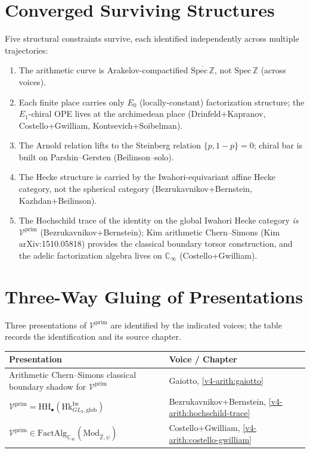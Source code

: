 \section{Converged Surviving Structures}
\label{v4-arith:app:B:converged-structures}

Five structural constraints survive, each identified independently
across multiple trajectories:

\begin{enumerate}
\item The arithmetic curve is Arakelov-compactified
\(\overline{\mathrm{Spec}\,\mathbb{Z}}\), not \(\mathrm{Spec}\,\mathbb{Z}\)
(across voices).
\item Each finite place carries only \(E_{0}\) (locally-constant)
factorization structure; the \(E_{1}\)-chiral OPE lives at the
archimedean place (Drinfeld+Kapranov, Costello+Gwilliam,
Kontsevich+Soibelman).
\item The Arnold relation lifts to the Steinberg relation
\(\{p,1-p\}=0\); chiral bar is built on Parshin--Gersten
(Beilinson--solo).
\item The Hecke structure is carried by the Iwahori-equivariant
affine Hecke category, not the spherical category
(Bezrukavnikov+Bernstein, Kazhdan+Beilinson).
\item The Hochschild trace of the identity on the global Iwahori
Hecke category \emph{is} \(\mathcal{V}^{\mathrm{prim}}\)
(Bezrukavnikov+Bernstein); Kim arithmetic Chern--Simons (Kim
arXiv:1510.05818) provides the classical boundary torsor
construction, and the adelic factorization algebra lives on
\(\mathbb{C}_{\infty}\) (Costello+Gwilliam).
\end{enumerate}

\section{Three-Way Gluing of Presentations}
\label{v4-arith:app:B:three-way-gluing}

Three presentations of $\mathcal{V}^{\mathrm{prim}}$ are identified by
the indicated voices; the table records the identification and
its source chapter.

\begin{center}
\begin{tabular}{l|l}
Presentation & Voice / Chapter \\
\hline
Arithmetic Chern--Simons classical boundary shadow for \(\mathcal{V}^{\mathrm{prim}}\) & Gaiotto, \ref{v4-arith:gaiotto} \\
\(\mathcal{V}^{\mathrm{prim}}=\mathrm{HH}_{\bullet}(\mathrm{Hk}^{\mathrm{Iw}}_{GL_{2},\mathrm{glob}})\) & Bezrukavnikov+Bernstein, \ref{v4-arith:hochschild-trace} \\
\(\mathcal{V}^{\mathrm{prim}}\in\mathrm{FactAlg}_{\mathbb{C}_{\infty}}(\mathrm{Mod}_{\widehat{\mathbb{Z}},\psi})\) & Costello+Gwilliam, \ref{v4-arith:costello-gwilliam}
\end{tabular}
\end{center}

